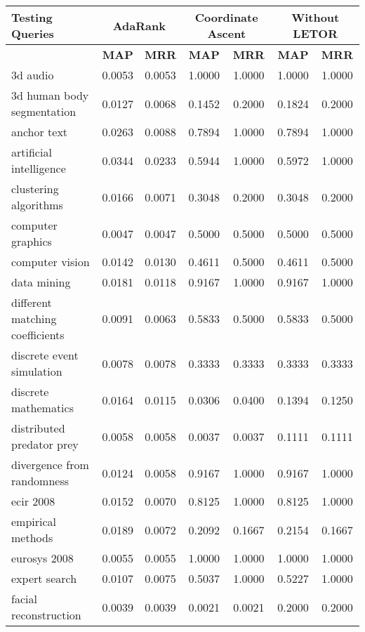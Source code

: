 \begin{table}
\centering
\begin{tabular}{|l|c|c|c|c|c|c|}
\hline \textbf{Testing Queries} & \multicolumn{2}{|c|}{\textbf{AdaRank}} & \multicolumn{2}{|c|}{\textbf{Coordinate Ascent}} & \multicolumn{2}{|c|}{\textbf{Without LETOR}} \\
\hline 				 & \textbf{MAP} & \textbf{MRR}  & \textbf{MAP} & \textbf{MRR}  & \textbf{MAP} & \textbf{MRR} \\
\hline 3d audio & 0.0053 & 0.0053 & 1.0000 & 1.0000 & 1.0000 & 1.0000 \\
\hline 3d human body segmentation & 0.0127 & 0.0068 & 0.1452 & 0.2000 & 0.1824 & 0.2000 \\
\hline anchor text & 0.0263 & 0.0088 & 0.7894 & 1.0000 & 0.7894 & 1.0000 \\
\hline artificial intelligence & 0.0344 & 0.0233 & 0.5944 & 1.0000 & 0.5972 & 1.0000 \\
\hline clustering algorithms & 0.0166 & 0.0071 & 0.3048 & 0.2000 & 0.3048 & 0.2000 \\
\hline computer graphics & 0.0047 & 0.0047 & 0.5000 & 0.5000 & 0.5000 & 0.5000 \\
\hline computer vision & 0.0142 & 0.0130 & 0.4611 & 0.5000 & 0.4611 & 0.5000 \\
\hline data mining & 0.0181 & 0.0118 & 0.9167 & 1.0000 & 0.9167 & 1.0000 \\
\hline different matching coefficients & 0.0091 & 0.0063 & 0.5833 & 0.5000 & 0.5833 & 0.5000 \\
\hline discrete event simulation & 0.0078 & 0.0078 & 0.3333 & 0.3333 & 0.3333 & 0.3333 \\
\hline discrete mathematics & 0.0164 & 0.0115 & 0.0306 & 0.0400 & 0.1394 & 0.1250 \\
\hline distributed predator prey & 0.0058 & 0.0058 & 0.0037 & 0.0037 & 0.1111 & 0.1111 \\
\hline divergence from randomness & 0.0124 & 0.0058 & 0.9167 & 1.0000 & 0.9167 & 1.0000 \\
\hline ecir 2008 & 0.0152 & 0.0070 & 0.8125 & 1.0000 & 0.8125 & 1.0000 \\
\hline empirical methods & 0.0189 & 0.0072 & 0.2092 & 0.1667 & 0.2154 & 0.1667 \\
\hline eurosys 2008 & 0.0055 & 0.0055 & 1.0000 & 1.0000 & 1.0000 & 1.0000 \\
\hline expert search & 0.0107 & 0.0075 & 0.5037 & 1.0000 & 0.5227 & 1.0000 \\
\hline facial reconstruction & 0.0039 & 0.0039 & 0.0021 & 0.0021 & 0.2000 & 0.2000 \\

\end{tabular}
\end{table}
